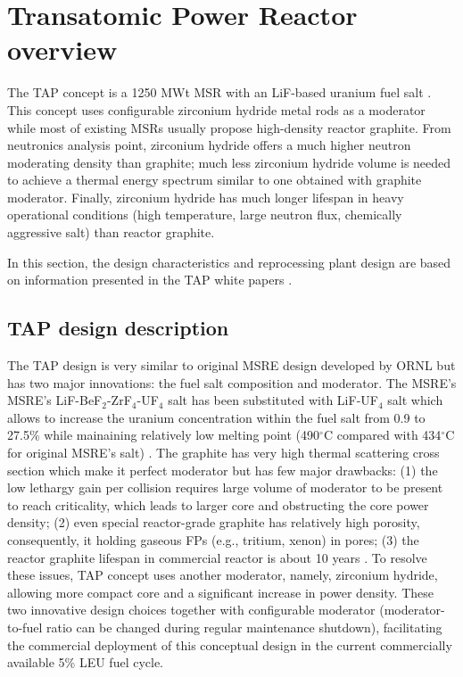 \section{Transatomic Power Reactor overview}
The \gls{TAP} concept is a 1250 MWt \gls{MSR} with an LiF-based uranium fuel salt 
\cite{transatomic_power_corporation_technical_2016}. This concept uses 
configurable zirconium hydride metal rods as a moderator while most of existing 
\glspl{MSR} usually propose high-density reactor graphite. From neutronics analysis 
point, zirconium hydride offers a much higher neutron moderating density than graphite;
much less zirconium hydride volume is needed to achieve a thermal energy spectrum similar to one obtained with graphite moderator. Finally, zirconium hydride has 
much longer lifespan in heavy operational conditions (high temperature, large 
neutron flux, chemically aggressive salt) than reactor graphite.

In this section, the design characteristics and reprocessing plant design 
are based on information presented in the \gls{TAP} white papers \cite{transatomic_power_corporation_technical_2016, transatomic_power_corporation_neutronics_2016}.

\subsection{TAP design description}
The \gls{TAP} design is very similar to original \gls{MSRE} design developed 
by \gls{ORNL} \cite{haubenreich_experience_1970} but has two major innovations: 
the fuel salt composition and moderator. The \gls{MSRE}'s MSRE’s 
LiF-BeF$_2$-ZrF$_4$-UF$_4$ salt has been substituted with LiF-UF$_4$ salt which 
allows to increase the uranium concentration within the fuel salt from 0.9 to 
27.5\% while mainaining relatively low melting point (490$^{\circ}$C compared 
with 434$^{\circ}$C 
for original \gls{MSRE}'s salt) \cite{betzler_two-dimensional_2016}. The 
graphite has very high 
thermal scattering cross section which make it perfect moderator but has 
few major drawbacks: 
(1) the low lethargy gain per collision requires large volume of moderator 
to be present to reach criticality, which leads to larger core and obstructing 
the core power density; (2) even special 
reactor-grade graphite has relatively high porosity, consequently, it holding 
gaseous \glspl{FP} 
(e.g., tritium, xenon) in pores; (3) the reactor graphite lifespan in commercial 
reactor is about 10 years \cite{robertson_conceptual_1971}. To resolve these 
issues, \gls{TAP} concept uses another 
moderator, namely, zirconium hydride, allowing more compact core and a 
significant increase in power density. These two innovative design choices 
together with configurable moderator 
(moderator-to-fuel ratio can be changed during regular maintenance shutdown),
 facilitating the commercial deployment of this conceptual design in the current 
commercially available 5\% \gls{LEU} fuel cycle. 

